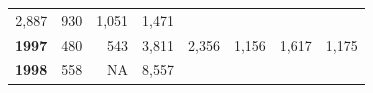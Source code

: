 \documentclass[]{article}
\begin{document}
\begin{longtable}[]{@{}rrrrrrrr@{}}
\begin{minipage}[t]{0.14\columnwidth}
2,887\strut
\end{minipage} & \begin{minipage}[t]{0.09\columnwidth}\raggedleft\strut
930\strut
\end{minipage} & \begin{minipage}[t]{0.08\columnwidth}\raggedleft\strut
1,051\strut
\end{minipage} & \begin{minipage}[t]{0.10\columnwidth}\raggedleft\strut
1,471\strut
\end{minipage}\tabularnewline
\begin{minipage}[t]{0.08\columnwidth}\raggedleft\strut
\textbf{1997}\strut
\end{minipage} & \begin{minipage}[t]{0.10\columnwidth}\raggedleft\strut
480\strut
\end{minipage} & \begin{minipage}[t]{0.11\columnwidth}\raggedleft\strut
543\strut
\end{minipage} & \begin{minipage}[t]{0.08\columnwidth}\raggedleft\strut
3,811\strut
\end{minipage} & \begin{minipage}[t]{0.14\columnwidth}\raggedleft\strut
2,356\strut
\end{minipage} & \begin{minipage}[t]{0.09\columnwidth}\raggedleft\strut
1,156\strut
\end{minipage} & \begin{minipage}[t]{0.08\columnwidth}\raggedleft\strut
1,617\strut
\end{minipage} & \begin{minipage}[t]{0.10\columnwidth}\raggedleft\strut
1,175\strut
\end{minipage}\tabularnewline
\begin{minipage}[t]{0.08\columnwidth}\raggedleft\strut
\textbf{1998}\strut
\end{minipage} & \begin{minipage}[t]{0.10\columnwidth}\raggedleft\strut
558\strut
\end{minipage} & \begin{minipage}[t]{0.11\columnwidth}\raggedleft\strut
NA\strut
\end{minipage} & \begin{minipage}[t]{0.08\columnwidth}\raggedleft\strut
8,557\strut
\end{minipage} & \begin{minipage}[t]{0.14\columnwidth}\raggedleft\strut

\end{minipage}
\end{longtable}
\end{document}
